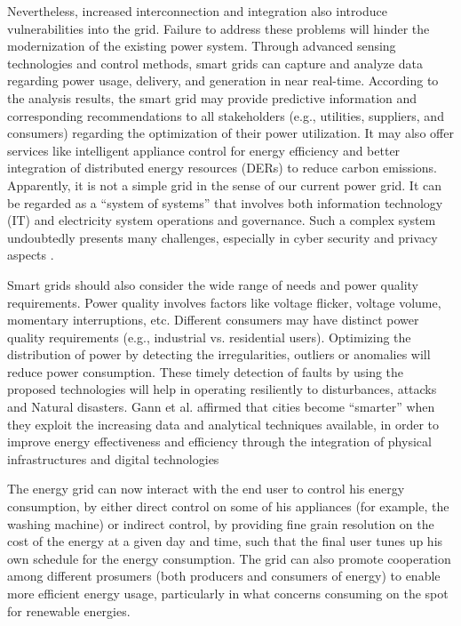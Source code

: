 Nevertheless, increased interconnection and integration also introduce vulnerabilities into the grid. Failure to address these problems will hinder the modernization of the existing power system. Through advanced sensing technologies and control methods, smart grids can capture and analyze data regarding power usage, delivery, and generation in near real-time. According to the analysis results, the smart grid may provide predictive information and corresponding recommendations to all stakeholders (e.g., utilities, suppliers, and consumers) regarding the optimization of their power utilization. It may also offer services like intelligent appliance control for energy efficiency and better integration of distributed energy resources (DERs) to reduce carbon emissions. Apparently, it is not a simple grid in the sense of our current power grid. It can be regarded as a “system of systems” that involves both information technology (IT) and electricity system operations and governance. Such a complex system undoubtedly presents many challenges, especially in cyber security and privacy aspects \cite{liu2012cyber}.

Smart grids should also consider the wide range of needs and power quality requirements. Power quality involves factors like voltage flicker, voltage volume, momentary interruptions, etc. Different consumers may have distinct power quality requirements (e.g., industrial vs. residential users). Optimizing the distribution of power by detecting the irregularities, outliers or anomalies will reduce power consumption. These timely detection of faults by using the proposed technologies will help in operating resiliently to disturbances, attacks and Natural disasters. Gann et al.  affirmed that cities become “smarter” when they exploit the increasing data and analytical techniques available, in order to improve energy effectiveness and efficiency through the integration of physical infrastructures and digital technologies \cite{gann2011physical}


The energy grid can now interact with the end user to control his energy consumption, by either direct control on some of his appliances (for example, the washing machine) or indirect control, by providing fine grain resolution on the cost of the energy at a given day and time, such that the final user tunes up his own schedule for the energy consumption. The grid can also promote cooperation among different prosumers (both producers and consumers of energy) to enable more efficient energy usage, particularly in what concerns consuming on the spot for renewable energies.

